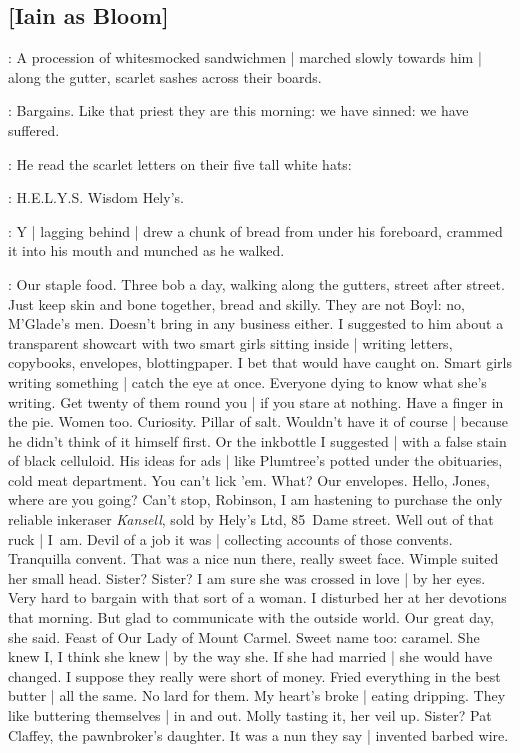 \subsection{[Iain as Bloom]}

:
A procession of whitesmocked sandwichmen |
marched slowly towards him |
along the gutter,
scarlet sashes across their boards.

\BloomInt:
Bargains.
Like that priest they are this morning:
we have sinned:
we have suffered.

:
He read the scarlet letters on their five tall white hats:

\BloomInt:
H.E.L.Y.S\@.
Wisdom Hely's.

:
Y |
lagging behind |
drew a chunk of bread from under his foreboard,
crammed it into his mouth
and munched as he walked.

\BloomInt:
Our staple food.
Three bob a day,
walking along the gutters,
street after street.
Just keep skin and bone together,
bread and skilly.
They are not Boyl:
no, M'Glade's men.
Doesn't bring in any business either.
I suggested to him about a transparent showcart
with two smart girls sitting inside |
writing letters, copybooks, envelopes, blottingpaper.
I bet that would have caught on.
Smart girls writing something |
catch the eye at once.
Everyone dying to know what she's writing.
Get twenty of them round you |
if you stare at nothing.
Have a finger in the pie.
Women too.
Curiosity.
Pillar of salt.
Wouldn't have it of course |
because he didn't think of it himself first.
Or the inkbottle I suggested |
with a false stain of black celluloid.
His ideas for ads |
like Plumtree's potted under the obituaries,
cold meat department.
You can't lick 'em.
What?
Our envelopes.
Hello, Jones, where are you going?
Can't stop, Robinson,
I am hastening to purchase the only reliable inkeraser \emph{Kansell},
sold by Hely's Ltd,
85~Dame street.
Well out of that ruck |
I~am.
Devil of a job it was |
collecting accounts of those convents.
Tranquilla convent.
That was a nice nun there,
really sweet face.
Wimple suited her small head.
Sister?
Sister?
I am sure she was crossed in love |
by her eyes.
Very hard to bargain with that sort of a woman.
I disturbed her at her devotions that morning.
But glad to communicate with the outside world.
Our great day,
she said.
Feast of Our Lady of Mount Carmel.
Sweet name too:
caramel.
She knew I,
I think she knew |
by the way she.
If she had married |
she would have changed.
I suppose they really were short of money.
Fried everything in the best butter |
all the same.
No lard for them.
My heart's broke |
eating dripping.
They like buttering themselves |
in and out.
Molly tasting it,
her veil up.
Sister?
Pat Claffey,
the pawnbroker's daughter.
It was a nun they say |
invented barbed wire.

